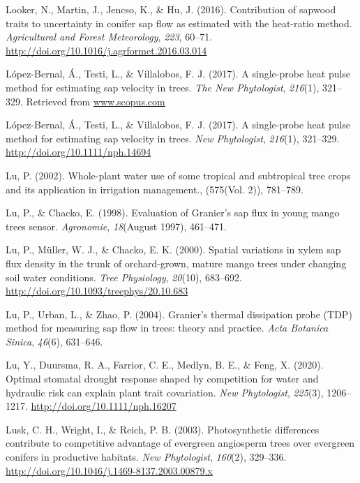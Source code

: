 \documentclass[11pt,twoside]{reedthesis}
\begin{document}
\hypertarget{ref-Looker2016}{}
Looker, N., Martin, J., Jencso, K., \& Hu, J. (2016). Contribution of
sapwood traits to uncertainty in conifer sap flow as estimated with the
heat-ratio method. \emph{Agricultural and Forest Meteorology},
\emph{223}, 60--71. \url{http://doi.org/10.1016/j.agrformet.2016.03.014}

\hypertarget{ref-Luxf3pez-Bernal2017}{}
López-Bernal, Á., Testi, L., \& Villalobos, F. J. (2017). A single-probe
heat pulse method for estimating sap velocity in trees. \emph{The New
Phytologist}, \emph{216}(1), 321--329. Retrieved from
\url{www.scopus.com}

\hypertarget{ref-lopez-bernal_single-probe_2017}{}
López-Bernal, Á., Testi, L., \& Villalobos, F. J. (2017). A single-probe
heat pulse method for estimating sap velocity in trees. \emph{New
Phytologist}, \emph{216}(1), 321--329.
\url{http://doi.org/10.1111/nph.14694}

\hypertarget{ref-Lu2002}{}
Lu, P. (2002). Whole-plant water use of some tropical and subtropical
tree crops and its application in irrigation management., (575(Vol. 2)),
781--789.

\hypertarget{ref-Lu1998}{}
Lu, P., \& Chacko, E. (1998). Evaluation of Granier's sap flux in young
mango trees sensor. \emph{Agronomie}, \emph{18}(August 1997), 461--471.

\hypertarget{ref-Lu2000}{}
Lu, P., Müller, W. J., \& Chacko, E. K. (2000). Spatial variations in
xylem sap flux density in the trunk of orchard-grown, mature mango trees
under changing soil water conditions. \emph{Tree Physiology},
\emph{20}(10), 683--692. \url{http://doi.org/10.1093/treephys/20.10.683}

\hypertarget{ref-Lu2004}{}
Lu, P., Urban, L., \& Zhao, P. (2004). Granier's thermal dissipation
probe (TDP) method for measuring sap flow in trees: theory and practice.
\emph{Acta Botanica Sinica}, \emph{46}(6), 631--646.

\hypertarget{ref-lu_optimal_2020}{}
Lu, Y., Duursma, R. A., Farrior, C. E., Medlyn, B. E., \& Feng, X.
(2020). Optimal stomatal drought response shaped by competition for
water and hydraulic risk can explain plant trait covariation. \emph{New
Phytologist}, \emph{225}(3), 1206--1217.
\url{http://doi.org/10.1111/nph.16207}

\hypertarget{ref-lusk_photosynthetic_2003}{}
Lusk, C. H., Wright, I., \& Reich, P. B. (2003). Photosynthetic
differences contribute to competitive advantage of evergreen angiosperm
trees over evergreen conifers in productive habitats. \emph{New
Phytologist}, \emph{160}(2), 329--336.
\url{http://doi.org/10.1046/j.1469-8137.2003.00879.x}
\end{document}
